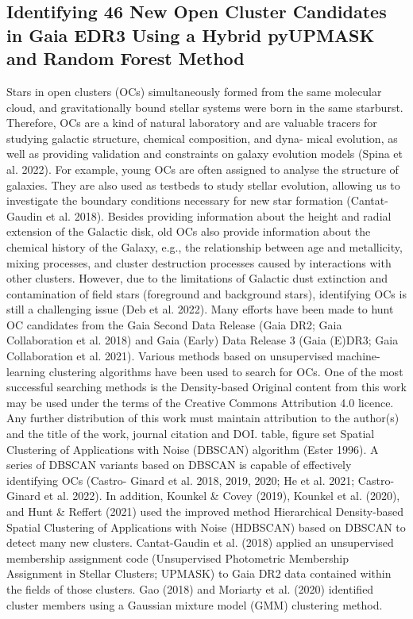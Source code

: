 \documentclass[../main.tex]{subfiles}
\begin{document}
\subsection{Identifying 46 New Open Cluster Candidates in Gaia EDR3 Using a Hybrid pyUPMASK and Random Forest Method} %

Stars in open clusters (OCs) simultaneously formed from the same molecular cloud, and gravitationally bound stellar systems were born in the same starburst. Therefore, OCs are a kind of natural laboratory and are valuable tracers for studying galactic structure, chemical composition, and dyna- mical evolution, as well as providing validation and constraints on galaxy evolution models (Spina et al. 2022). For example, young OCs are often assigned to analyse the structure of galaxies. They are also used as testbeds to study stellar evolution, allowing us to investigate the boundary conditions necessary for new star formation (Cantat-Gaudin et al. 2018). Besides providing information about the height and radial extension of the Galactic disk, old OCs also provide information about the chemical history of the Galaxy, e.g., the relationship between age and metallicity, mixing processes, and cluster destruction processes caused by interactions with other clusters.
However, due to the limitations of Galactic dust extinction and contamination of field stars (foreground and background stars), identifying OCs is still a challenging issue (Deb et al. 2022). Many efforts have been made to hunt OC candidates from the Gaia Second Data Release (Gaia DR2; Gaia Collaboration et al. 2018) and Gaia (Early) Data Release 3 (Gaia (E)DR3; Gaia Collaboration et al. 2021).
Various methods based on unsupervised machine-learning clustering algorithms have been used to search for OCs. One of the most successful searching methods is the Density-based
Original content from this work may be used under the terms
of the Creative Commons Attribution 4.0 licence. Any further distribution of this work must maintain attribution to the author(s) and the title of the work, journal citation and DOI.
table, figure set
Spatial Clustering of Applications with Noise (DBSCAN) algorithm (Ester 1996). A series of DBSCAN variants based on DBSCAN is capable of effectively identifying OCs (Castro- Ginard et al. 2018, 2019, 2020; He et al. 2021; Castro-Ginard et al. 2022). In addition, Kounkel & Covey (2019), Kounkel et al. (2020), and Hunt & Reffert (2021) used the improved method Hierarchical Density-based Spatial Clustering of Applications with Noise (HDBSCAN) based on DBSCAN to detect many new clusters. Cantat-Gaudin et al. (2018) applied an unsupervised membership assignment code (Unsupervised Photometric Membership Assignment in Stellar Clusters; UPMASK) to Gaia DR2 data contained within the fields of those clusters. Gao (2018) and Moriarty et al. (2020) identified cluster members using a Gaussian mixture model (GMM) clustering method.
\end{document}
